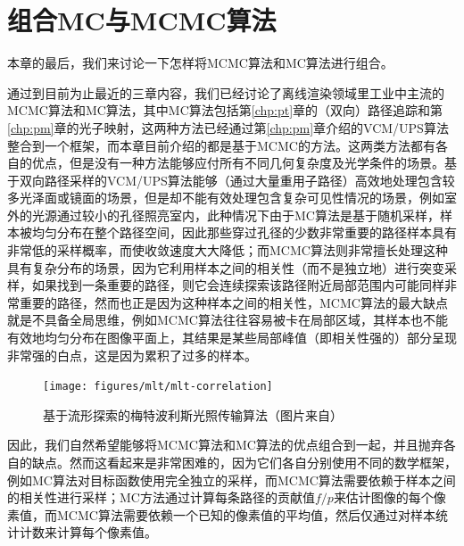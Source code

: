 \section{组合MC与MCMC算法}\label{sec:mlt-combine}
本章的最后，我们来讨论一下怎样将MCMC算法和MC算法进行组合。

通过到目前为止最近的三章内容，我们已经讨论了离线渲染领域里工业中主流的MCMC算法和MC算法，其中MC算法包括第\ref{chp:pt}章的（双向）路径追踪和第\ref{chp:pm}章的光子映射，这两种方法已经通过第\ref{chp:pm}章介绍的VCM/UPS算法整合到一个框架，而本章目前介绍的都是基于MCMC的方法。这两类方法都有各自的优点，但是没有一种方法能够应付所有不同几何复杂度及光学条件的场景。基于双向路径采样的VCM/UPS算法能够（通过大量重用子路径）高效地处理包含较多光泽面或镜面的场景，但是却不能有效处理包含复杂可见性情况的场景，例如室外的光源通过较小的孔径照亮室内，此种情况下由于MC算法是基于随机采样，样本被均匀分布在整个路径空间，因此那些穿过孔径的少数非常重要的路径样本具有非常低的采样概率，而使收敛速度大大降低；而MCMC算法则非常擅长处理这种具有复杂分布的场景，因为它利用样本之间的相关性（而不是独立地）进行突变采样，如果找到一条重要的路径，则它会连续探索该路径附近局部范围内可能同样非常重要的路径，然而也正是因为这种样本之间的相关性，MCMC算法的最大缺点就是不具备全局思维，例如MCMC算法往往容易被卡在局部区域，其样本也不能有效地均匀分布在图像平面上，其结果是某些局部峰值（即相关性强的）部分呈现非常强的白点，这是因为累积了过多的样本。

\begin{figure}
	\texttt{[image: figures/mlt/mlt-correlation]}
	\caption{基于流形探索的梅特波利斯光照传输算法（图片来自\cite{a:ManifoldExplorationAMarkovChainMonteCarloTechniqueforRenderingSceneswithDifficultSpecularTransport}）}
	\label{f:mlt-mlt-correlation}
\end{figure}


因此，我们自然希望能够将MCMC算法和MC算法的优点组合到一起，并且抛弃各自的缺点。然而这看起来是非常困难的，因为它们各自分别使用不同的数学框架，例如MC算法对目标函数使用完全独立的采样，而MCMC算法需要依赖于样本之间的相关性进行采样；MC方法通过计算每条路径的贡献值$f/p$来估计图像的每个像素值，而MCMC算法需要依赖一个已知的像素值的平均值，然后仅通过对样本统计计数来计算每个像素值。

